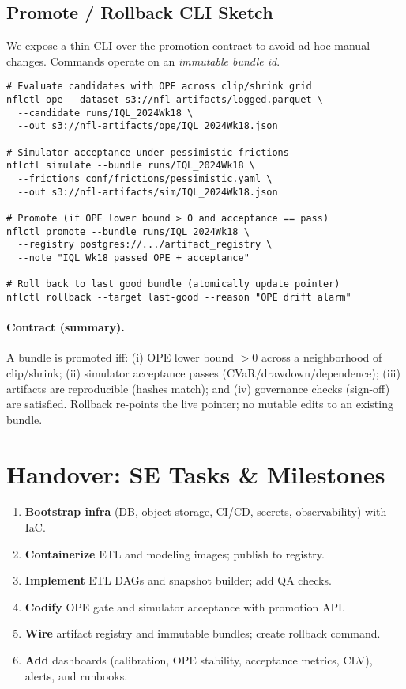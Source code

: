 \subsection*{Promote / Rollback CLI Sketch}
We expose a thin CLI over the promotion contract to avoid ad-hoc manual changes. Commands operate on an \emph{immutable bundle id}.
\begin{verbatim}
# Evaluate candidates with OPE across clip/shrink grid
nflctl ope --dataset s3://nfl-artifacts/logged.parquet \
  --candidate runs/IQL_2024Wk18 \
  --out s3://nfl-artifacts/ope/IQL_2024Wk18.json

# Simulator acceptance under pessimistic frictions
nflctl simulate --bundle runs/IQL_2024Wk18 \
  --frictions conf/frictions/pessimistic.yaml \
  --out s3://nfl-artifacts/sim/IQL_2024Wk18.json

# Promote (if OPE lower bound > 0 and acceptance == pass)
nflctl promote --bundle runs/IQL_2024Wk18 \
  --registry postgres://.../artifact_registry \
  --note "IQL Wk18 passed OPE + acceptance"

# Roll back to last good bundle (atomically update pointer)
nflctl rollback --target last-good --reason "OPE drift alarm"
\end{verbatim}
\paragraph{Contract (summary).} A bundle is promoted iff: (i) OPE lower bound $>0$ across a neighborhood of clip/shrink; (ii) simulator acceptance passes (CVaR/drawdown\slash{}dependence); (iii) artifacts are reproducible (hashes match); and (iv) governance checks (sign-off) are satisfied. Rollback re-points the live pointer; no mutable edits to an existing bundle.

\section{Handover: SE Tasks \& Milestones}
\begin{enumerate}
  \item \textbf{Bootstrap infra} (DB, object storage, CI/CD, secrets, observability) with IaC.
  \item \textbf{Containerize} ETL and modeling images; publish to registry.
  \item \textbf{Implement} ETL DAGs and snapshot builder; add QA checks.
  \item \textbf{Codify} OPE gate and simulator acceptance with promotion API.
  \item \textbf{Wire} artifact registry and immutable bundles; create rollback command.
  \item \textbf{Add} dashboards (calibration, OPE stability, acceptance metrics, CLV), alerts, and runbooks.
\end{enumerate}

